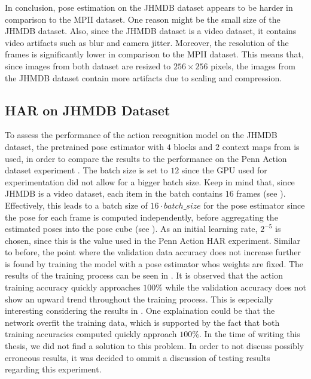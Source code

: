 In conclusion, pose estimation on the JHMDB dataset appears to be harder in comparison to the MPII dataset.
One reason might be the small size of the JHMDB dataset.
Also, since the JHMDB dataset is a video dataset, it contains video artifacts such as blur and camera jitter.
Moreover, the resolution of the frames is significantly lower in comparison to the MPII dataset.
This means that, since images from both dataset are resized to $256 \times 256$ pixels, the images from the JHMDB dataset contain more artifacts due to scaling and compression. 

\subsection{HAR on JHMDB Dataset}
To assess the performance of the action recognition model on the JHMDB dataset, the pretrained pose estimator with $4$ blocks and $2$ context maps from  is used, in order to compare the results to the performance on the Penn Action dataset experiment .
The batch size is set to $12$ since the GPU used for experimentation did not allow for a bigger batch size.
Keep in mind that, since JHMDB is a video dataset, each item in the batch contains $16$ frames (see ).
Effectively, this leads to a batch size of $16 \cdot batch\_size$ for the pose estimator since the pose for each frame is computed independently, before aggregating the estimated poses into the pose cube (see ).
As an initial learning rate, $2^{-5}$ is chosen, since this is the value used in the Penn Action HAR experiment.
Similar to before, the point where the validation data accuracy does not increase further is found by training the model with a pose estimator whos weights are fixed.
The results of the training process can be seen in .
It is observed that the action training accuracy quickly approaches $100\%$ while the validation accuracy does not show an upward trend throughout the training process.
This is especially interesting considering the results in .
One explaination could be that the network overfit the training data, which is supported by the fact that both training accuracies computed quickly approach $100\%$.
In the time of writing this thesis, we did not find a solution to this problem.
In order to not discuss possibly erroneous results, it was decided to ommit a discussion of testing results regarding this experiment.

